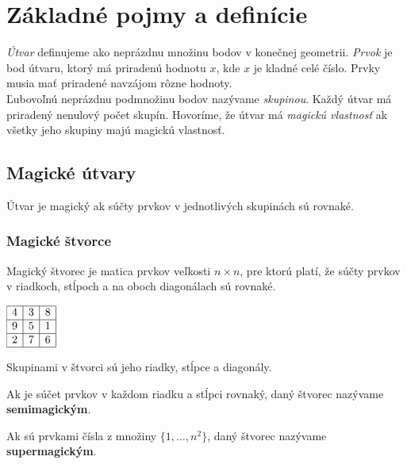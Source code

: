 \chapter{Základné pojmy a definície}

\label{kap:definitions} %

\textit{Útvar} definujeme ako neprázdnu množinu bodov v konečnej geometrii. \textit{Prvok} je bod útvaru, ktorý má priradenú hodnotu $x$, kde $x$ je kladné celé číslo. Prvky musia mať priradené navzájom rôzne hodnoty. \\

Ľubovoľnú neprázdnu podmnožinu bodov nazývame \textit{skupinou}. Každý útvar má priradený nenulový počet skupín. Hovoríme, že útvar má \textit{magickú vlastnosť} ak všetky jeho skupiny majú magickú vlastnosť.

\section{Magické útvary}
\begin{definition} Útvar je magický ak súčty prvkov v jednotlivých skupinách sú rovnaké.
\end{definition}

\subsection{Magické štvorce}
\begin{definition} Magický štvorec je matica prvkov veľkosti $n \times n$, pre ktorú platí, že súčty prvkov v riadkoch, stĺpoch a na oboch diagonálach sú rovnaké.
\end{definition}

\begin{center}
$\begin{array}{ |c|c|c| } 
\hline
4 & 3 & 8 \\ 
\hline
9 & 5 & 1 \\ 
\hline
2 & 7 & 6 \\
\hline
\end{array}$
\end{center}

Skupinami v štvorci sú jeho riadky, stĺpce a diagonály.

\begin{definition} Ak je súčet prvkov v každom riadku a stĺpci rovnaký, daný štvorec nazývame \textbf{semimagickým}.
\end{definition}

\begin{definition} Ak sú prvkami čísla z množiny $\{1, \dots, n^2\}$, daný štvorec nazývame \textbf{supermagickým}.
\end{definition}

